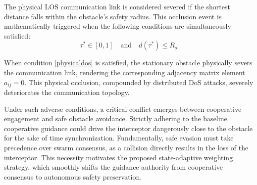 \documentclass[lettersize,journal]{IEEEtran}
\begin{document}
The physical LOS communication link is considered severed if the shortest distance falls within the obstacle's safety radius. This occlusion event is mathematically triggered when the following conditions are simultaneously satisfied:
\begin{equation}
	\label{physicaldos}
	\tau^* \in [0, 1] \quad \text{and} \quad d(\tau^*) \le R_o
\end{equation}

When condition \eqref{physicaldos} is satisfied, the stationary obstacle physically severs the communication link, rendering the corresponding adjacency matrix element $a_{ij} = 0$. This physical occlusion, compounded by distributed DoS attacks, severely deteriorates the communication topology. 



Under such adverse conditions, a critical conflict emerges between cooperative engagement and safe obstacle avoidance. Strictly adhering to the baseline cooperative guidance could drive the interceptor dangerously close to the obstacle for the sake of time synchronization. Fundamentally, safe evasion must take precedence over swarm consensus, as a collision directly results in the loss of the interceptor. This necessity motivates the proposed state-adaptive weighting strategy, which smoothly shifts the guidance authority from cooperative consensus to autonomous safety preservation.
\end{document}
